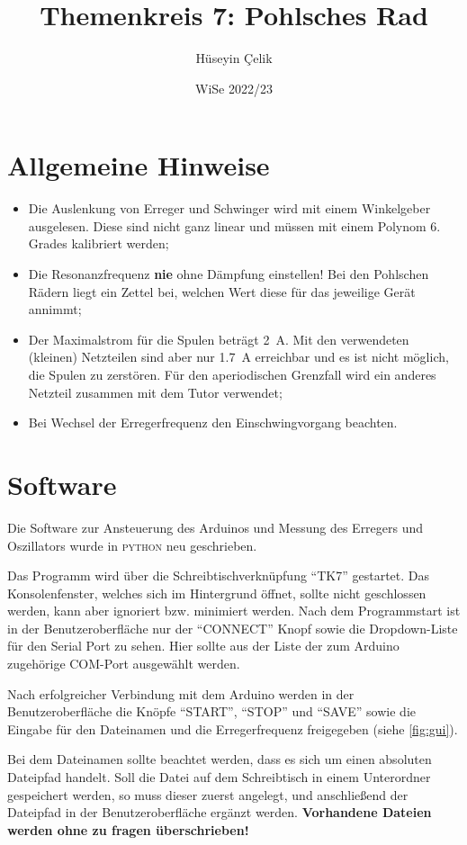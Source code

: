 \documentclass[ngerman,a4paper,11pt]{article}
\title{\bf Themenkreis 7: Pohlsches Rad}
\author{\sc Hüseyin Çelik}
\date{WiSe 2022/23}
\begin{document}
\maketitle
\section*{Allgemeine Hinweise}
\begin{itemize}
  \item Die Auslenkung von Erreger und Schwinger wird mit einem Winkelgeber ausgelesen. Diese sind nicht ganz linear und müssen mit einem Polynom 6. Grades kalibriert werden;
  \item Die Resonanzfrequenz \textbf{nie} ohne Dämpfung einstellen! Bei den Pohlschen Rädern liegt ein Zettel bei, welchen Wert diese für das jeweilige Gerät annimmt;
  \item Der Maximalstrom für die Spulen beträgt \SI{2}{\ampere}. Mit den verwendeten (kleinen) Netzteilen sind aber nur \SI{1.7}{\ampere} erreichbar und es ist nicht möglich, die Spulen zu zerstören. Für den aperiodischen Grenzfall wird ein anderes Netzteil zusammen mit dem Tutor verwendet;
  \item Bei Wechsel der Erregerfrequenz den Einschwingvorgang beachten.
\end{itemize}
\section*{Software}
Die Software zur Ansteuerung des Arduinos und Messung des Erregers und Oszillators wurde in \textsc{python} neu geschrieben.

Das Programm wird über die Schreibtischverknüpfung \enquote{TK7} gestartet. Das Konsolenfenster, welches sich im Hintergrund öffnet, sollte nicht geschlossen werden, kann aber ignoriert bzw. minimiert werden. Nach dem Programmstart ist in der Benutzeroberfläche nur der \enquote{CONNECT} Knopf sowie die Dropdown-Liste für den Serial Port zu sehen. Hier sollte aus der Liste der zum Arduino zugehörige COM-Port ausgewählt werden.

Nach erfolgreicher Verbindung mit dem Arduino werden in der Benutzeroberfläche die Knöpfe \enquote{START}, \enquote{STOP} und \enquote{SAVE} sowie die Eingabe für den Dateinamen und die Erregerfrequenz freigegeben (siehe \cref{fig:gui}).

Bei dem Dateinamen sollte beachtet werden, dass es sich um einen absoluten Dateipfad handelt. Soll die Datei auf dem Schreibtisch in einem Unterordner gespeichert werden, so muss dieser zuerst angelegt, und anschließend der Dateipfad in der Benutzeroberfläche ergänzt werden. \textbf{Vorhandene Dateien werden ohne zu fragen überschrieben!}
\end{document}

